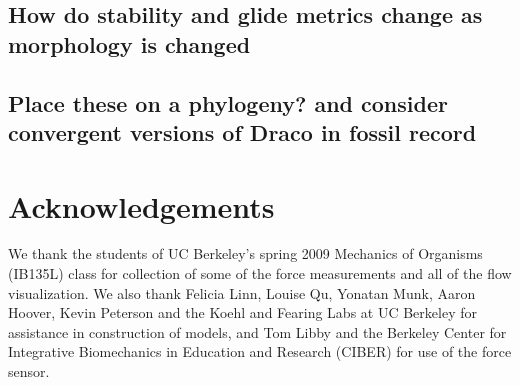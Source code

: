\documentclass[10pt]{article}
\begin{document}
\subsection{How do stability and glide metrics change as morphology is changed}

\subsection{Place these on a phylogeny? and consider convergent versions of Draco in fossil record}

\section*{Acknowledgements}
We thank the students of UC Berkeley's spring 2009 Mechanics of Organisms (IB135L) class for collection of some of the force measurements and all of the flow visualization.  We also thank Felicia Linn, Louise Qu, Yonatan Munk, Aaron Hoover, Kevin Peterson and the Koehl and Fearing Labs at UC Berkeley for assistance in construction of models, and Tom Libby and the Berkeley Center for Integrative Biomechanics in Education and Research (CIBER) for use of the force sensor.

\end{document}
